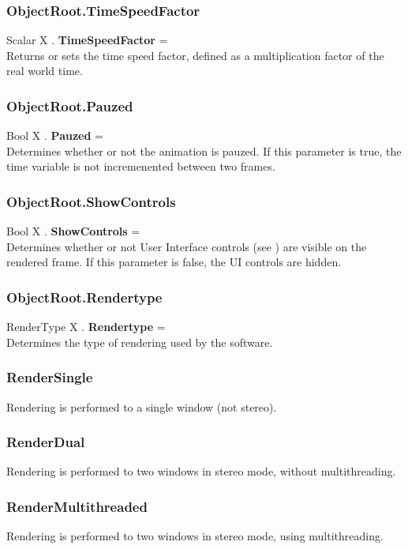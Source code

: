 \subsubsection{ObjectRoot.TimeSpeedFactor \label{F:ObjectRoot:TimeSpeedFactor}}
Scalar X . \textbf{TimeSpeedFactor} = \\
Returns or sets the time speed factor, defined as a multiplication factor of the real world time.

\subsubsection{ObjectRoot.Pauzed \label{F:ObjectRoot:Pauzed}}
Bool X . \textbf{Pauzed} = \\
Determines whether or not the animation is pauzed. If this parameter is true, the time variable is not incremenented between two frames.

\subsubsection{ObjectRoot.ShowControls \label{F:ObjectRoot:ShowControls}}
Bool X . \textbf{ShowControls} = \\
Determines whether or not User Interface controls (see ) are visible on the rendered frame. If this parameter is false, the UI controls are hidden.

\subsubsection{ObjectRoot.Rendertype \label{F:ObjectRoot:Rendertype}}
RenderType X . \textbf{Rendertype} = \\
Determines the type of rendering used by the software.

\subsubsection{RenderSingle \label{T:RenderType|RenderSingle}}
Rendering is performed to a single window (not stereo).

\subsubsection{RenderDual \label{T:RenderType|RenderDual}}
Rendering is performed to two windows in stereo mode, without multithreading.

\subsubsection{RenderMultithreaded \label{T:RenderType|RenderMultithreaded}}
Rendering is performed to two windows in stereo mode, using multithreading.

